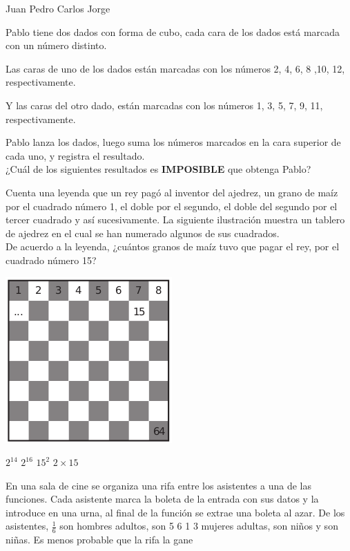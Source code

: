 \documentclass[10pt,letterpaper,addpoints]{exam}
\begin{document}
\begin{questions}
\begin{oneparchoices}
\choice Juan
\choice Pedro
\CorrectChoice Carlos
\choice Jorge
\end{oneparchoices}
\question Pablo tiene dos dados con forma de cubo, cada cara de los dados está marcada con un número distinto.

Las caras de uno de los dados están marcadas con los números 2, 4, 6, 8 ,10, 12, respectivamente.

Y las caras del otro dado, están marcadas con los números 1, 3, 5, 7, 9, 11, respectivamente.

Pablo lanza los dados, luego suma los números marcados en la cara superior de cada uno, y registra el resultado.
\\
¿Cuál de los siguientes resultados es \textbf{IMPOSIBLE} que obtenga Pablo?

\begin{oneparchoices}
\end{oneparchoices}

\begin{minipage}{.5\textwidth}
\question Cuenta una leyenda que un rey pagó al inventor del ajedrez, un grano de maíz por el cuadrado número 1, el doble por el segundo, el doble del segundo por el tercer cuadrado y así sucesivamente. La siguiente ilustración muestra un tablero de ajedrez en el cual se han numerado algunos de sus cuadrados.\\

De acuerdo a la leyenda, ¿cuántos granos de maíz tuvo que pagar el rey, por el cuadrado número 15?
\end{minipage}\hfill
\begin{minipage}{.5\textwidth}
\begin{center}
\includegraphics[scale=.8]{Images/ajedrez.png} 
\end{center}
\end{minipage}

\begin{oneparchoices}
\CorrectChoice $2^{14}$
\choice $2^{16}$
\choice $15^{2}$
\choice $2\times 15$
\end{oneparchoices}
\question En una sala de cine se organiza una rifa entre los asistentes a una de las funciones. Cada asistente marca la boleta de la entrada con sus datos y la introduce en una urna, al final de la función se extrae una boleta al azar. De los asistentes, $\frac{1}{6}$ son hombres adultos,       son
5
6
1
3
mujeres adultas,      son niños y       son niñas. Es menos probable que la rifa la gane

\end{questions}
\end{document}
